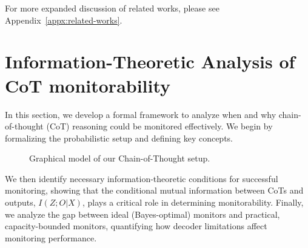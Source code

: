 \documentclass{article}
\theoremstyle{plain}
\begin{document}
For more expanded discussion of related works, please see Appendix~\ref{appx:related-works}.





\section{Information-Theoretic Analysis of CoT monitorability}
In this section, we develop a formal framework to analyze when and why chain-of-thought (CoT) reasoning could be monitored effectively. 
We begin by formalizing the probabilistic setup and defining key concepts. 
\label{subsec:setup}
\begin{figure}
  \centering
  \vspace{-8pt}

  \caption{Graphical model of our Chain-of-Thought setup.}
  \label{fig:cot_model}
  \vspace{-8pt}
\end{figure}
We then identify necessary information-theoretic conditions for successful monitoring, showing that the conditional mutual information between CoTs and outputs, $I(Z;O|X)$, plays a critical role in determining monitorability. 
Finally, we analyze the gap between ideal (Bayes-optimal) monitors and practical, capacity-bounded monitors, quantifying how decoder limitations affect monitoring performance.
\end{document}
